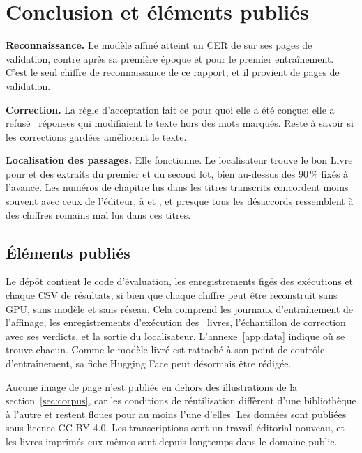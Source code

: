\section{Conclusion et éléments publiés}
\label{sec:conclusion}

\textbf{Reconnaissance.} Le modèle affiné atteint un CER de \trainCer{} sur
ses pages de validation, contre \trainCerFirstEpoch{} après sa première époque
et \trainCerConstant{} pour le premier entraînement. C'est le seul chiffre de
reconnaissance de ce rapport, et il provient de pages de validation.

\textbf{Correction.} La règle d'acceptation fait ce pour quoi elle a été
conçue: elle a refusé \corrRewritesCaught{}~réponses qui modifiaient le texte
hors des mots marqués. Reste à savoir si les corrections gardées améliorent le
texte.

\textbf{Localisation des passages.} Elle fonctionne. Le localisateur trouve le
bon Livre pour \locLivreAccuracyWorkbook{} et \locLivreAccuracyCatalogue{} des
extraits du premier et du second lot, bien au-dessus des 90\,\% fixés à
l'avance. Les numéros de chapitre lus dans les titres transcrits concordent
moins souvent avec ceux de l'éditeur, à \locChapterAccuracyWorkbook{} et
\locChapterAccuracyCatalogue{}, et presque tous les désaccords ressemblent à
des chiffres romains mal lus dans ces titres.

\subsection{Éléments publiés}
\label{sec:artefacts}

Le dépôt contient le code d'évaluation, les enregistrements figés des
exécutions et chaque CSV de résultats, si bien que chaque chiffre peut être
reconstruit sans GPU, sans modèle et sans réseau. Cela comprend les journaux
d'entraînement de l'affinage, les enregistrements d'exécution des
\ocrBooks{}~livres, l'échantillon de correction avec ses verdicts, et la sortie
du localisateur. L'annexe~\ref{app:data} indique où se trouve chacun. Comme le
modèle livré est rattaché à son point de contrôle d'entraînement, sa fiche
Hugging Face peut désormais être rédigée.

Aucune image de page n'est publiée en dehors des illustrations de la
section~\ref{sec:corpus}, car les conditions de réutilisation diffèrent d'une
bibliothèque à l'autre et restent floues pour au moins l'une d'elles. Les
données sont publiées sous licence CC-BY-4.0. Les transcriptions sont un
travail éditorial nouveau, et les livres imprimés eux-mêmes sont depuis
longtemps dans le domaine public.
